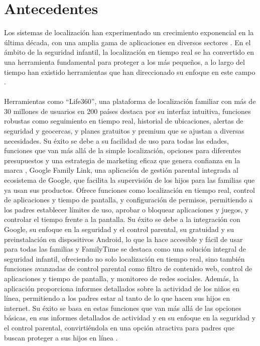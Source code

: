 \documentclass[12pt,onehalfspacing]{report}
\begin{document}
\section{Antecedentes}
Los sistemas de localización han experimentado un crecimiento exponencial en la última década, con una amplia gama de aplicaciones en diversos sectores \cite{survey_localization}. En el ámbito de la seguridad infantil, la localización en tiempo real se ha convertido en una herramienta fundamental para proteger a los más pequeños, a lo largo del tiempo han existido herramientas que han direccionado su enfoque en este campo \cite{indoor_localization}.\\\\
Herramientas como “Life360”, una plataforma de localización familiar con más de 30 millones de usuarios en 200 países destaca por su interfaz intuitiva, funciones robustas como seguimiento en tiempo real, historial de ubicaciones, alertas de seguridad y geocercas, y planes gratuitos y premium que se ajustan a diversas necesidades. Su éxito se debe a su facilidad de uso para todas las edades, funciones que van más allá de la simple localización, opciones para diferentes presupuestos y una estrategia de marketing eficaz que genera confianza en la marca \cite{life360}, Google Family Link, una aplicación de gestión parental integrada al ecosistema de Google, que facilita la supervisión de los hijos para las familias que ya usan sus productos. Ofrece funciones como localización en tiempo real, control de aplicaciones y tiempo de pantalla, y configuración de permisos, permitiendo a los padres establecer límites de uso, aprobar o bloquear aplicaciones y juegos, y controlar el tiempo frente a la pantalla. Su éxito se debe a la integración con Google, su enfoque en la seguridad y el control parental, su gratuidad y su preinstalación en dispositivos Android, lo que la hace accesible y fácil de usar para todas las familias \cite{google_family_link} y FamilyTime se destaca como una solución integral de seguridad infantil, ofreciendo no solo localización en tiempo real, sino también funciones avanzadas de control parental como filtro de contenido web, control de aplicaciones y tiempo de pantalla, y monitoreo de redes sociales. Además, la aplicación proporciona informes detallados sobre la actividad de los niños en línea, permitiendo a los padres estar al tanto de lo que hacen sus hijos en internet. Su éxito se basa en estas funciones que van más allá de las opciones básicas, en sus informes detallados de actividad y en su enfoque en la seguridad y el control parental, convirtiéndola en una opción atractiva para padres que buscan proteger a sus hijos en línea \cite{familytime}.\\\\
\end{document}
